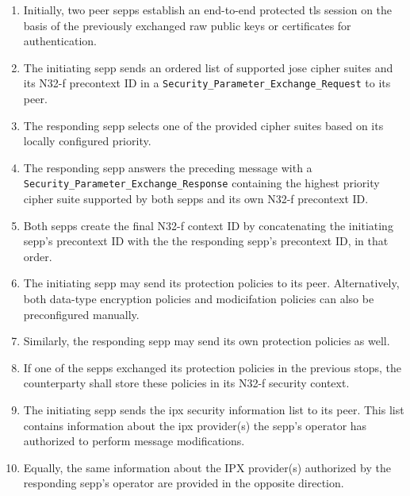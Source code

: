 \begin{enumerate}[wide, labelwidth=!, labelindent=0pt]
    \item Initially, two peer \glspl{sepp} establish an end-to-end protected \gls{tls} session on the basis of the previously exchanged raw public keys or certificates for authentication.
    \item The initiating \gls{sepp} sends an ordered list of supported \gls{jose} cipher suites and its N32-f precontext ID in a \texttt{Security\_Parameter\_Exchange\_Request} to its peer.
    \item The responding \gls{sepp} selects one of the provided cipher suites based on its locally configured priority.
    \item The responding \gls{sepp} answers the preceding message with a \texttt{Security\_Parameter\_Exchange\_Response} containing the highest priority cipher suite supported by both \glspl{sepp} and its own N32-f precontext ID.
    \item Both \glspl{sepp} create the final N32-f context ID by concatenating the initiating \gls{sepp}'s precontext ID with the the responding \gls{sepp}'s precontext ID, in that order.
    \item The initiating \gls{sepp} may send its protection policies to its peer. Alternatively, both data-type encryption policies and modicifation policies can also be preconfigured manually.
    \item Similarly, the responding \gls{sepp} may send its own protection policies as well.
    \item If one of the \glspl{sepp} exchanged its protection policies in the previous stops, the counterparty shall store these policies in its N32-f security context.
    \item The initiating \gls{sepp} sends the \gls{ipx} security information list to its peer. This list contains information about the \gls{ipx} provider(s) the \gls{sepp}'s operator has authorized to perform message modifications.
    \item Equally, the same information about the IPX provider(s) authorized by the responding \gls{sepp}'s operator are provided in the opposite direction.

\end{enumerate}
